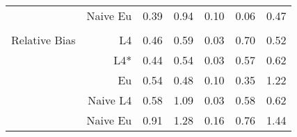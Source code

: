 \documentclass[a4paper,12pt,twoside]{book}
\begin{document}
\begin{table}[H]
\begin{tabular}{crrrrrr}
&Naive Eu &  0.39 & 0.94 & 0.10 & 0.06 & 0.47 \\ 
  
   \\

   \hline
   
{\color{blue} Relative Bias } & L4  &0.46 & 0.59 & 0.03 & 0.70 & 0.52 \\ 
 
&L4*  & 0.44 & 0.54 & 0.03 & 0.57 & 0.62 \\ 
  
  
&Eu &  
 0.54 & 0.48 & 0.10 & 0.35 & 1.22 \\ 
 

&Naive L4&  
  0.58 & 1.09 & 0.03 & 0.58 & 0.62 \\ 
  
  
&Naive Eu &  
     0.91 & 1.28 & 0.16 & 0.76 & 1.44 \\ 
  
\end{tabular}

\end{table}
\end{document}
